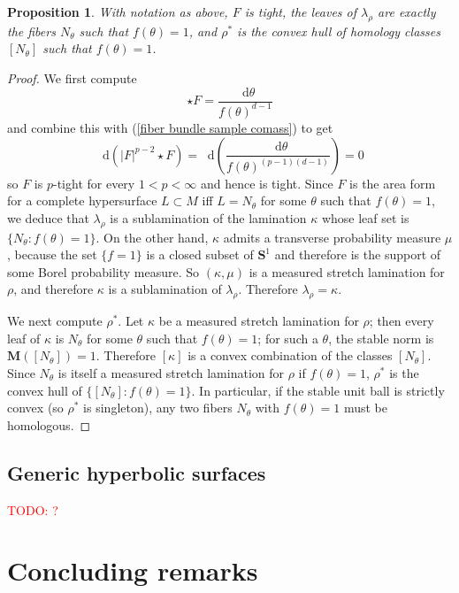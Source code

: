 \documentclass[reqno,11pt]{amsart}
\newcommand{\Sph}{\mathbf S}
\newcommand*\dif{\mathop{}\!\mathrm{d}}
\newcommand{\Mass}{\mathbf M}
\newtheorem{proposition}[theorem]{Proposition}
\theoremstyle{definition}
\numberwithin{equation}{section}
\newcommand\todo[1]{\textcolor{red}{TODO: #1}}
\begin{document}
\begin{proposition}
With notation as above, $F$ is tight, the leaves of $\lambda_\rho$ are exactly the fibers $N_\theta$ such that $f(\theta) = 1$, and $\rho^*$ is the convex hull of homology classes $[N_\theta]$ such that $f(\theta) = 1$.
\end{proposition}
\begin{proof}
We first compute
$$\star F = \frac{\dif \theta}{f(\theta)^{d - 1}}$$
and combine this with (\ref{fiber bundle sample comass}) to get
$$\dif(|F|^{p - 2} \star F) = \dif\left(\frac{\dif \theta}{f(\theta)^{(p - 1)(d - 1)}}\right) = 0$$
so $F$ is $p$-tight for every $1 < p < \infty$ and hence is tight.
Since $F$ is the area form for a complete hypersurface $L \subset M$ iff $L = N_\theta$ for some $\theta$ such that $f(\theta) = 1$, we deduce that $\lambda_\rho$ is a sublamination of the lamination $\kappa$ whose leaf set is $\{N_\theta: f(\theta) = 1\}$.
On the other hand, $\kappa$ admits a transverse probability measure $\mu$, because the set $\{f = 1\}$ is a closed subset of $\Sph^1$ and therefore is the support of some Borel probability measure.
So $(\kappa, \mu)$ is a measured stretch lamination for $\rho$, and therefore $\kappa$ is a sublamination of $\lambda_\rho$.
Therefore $\lambda_\rho = \kappa$.

We next compute $\rho^*$.
Let $\kappa$ be a measured stretch lamination for $\rho$; then every leaf of $\kappa$ is $N_\theta$ for some $\theta$ such that $f(\theta) = 1$; for such a $\theta$, the stable norm is $\Mass([N_\theta]) = 1$.
Therefore $[\kappa]$ is a convex combination of the classes $[N_\theta]$.
Since $N_\theta$ is itself a measured stretch lamination for $\rho$ if $f(\theta) = 1$, $\rho^*$ is the convex hull of $\{[N_\theta]: f(\theta) = 1\}$.
In particular, if the stable unit ball is strictly convex (so $\rho^*$ is singleton), any two fibers $N_\theta$ with $f(\theta) = 1$ must be homologous.
\end{proof}

\subsection{Generic hyperbolic surfaces}
\todo{?}



\section{Concluding remarks}\label{open problems}
\end{document}
